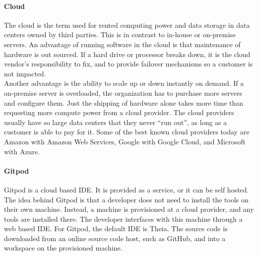 \paragraph{Cloud}
The \gls{cloud} is the term used for rented computing power and data storage in data centers owned by third parties.
This is in contrast to in-house or on-premise servers.
An advantage of running software in the \gls{cloud} is that maintenance of hardware is out sourced.
If a hard drive or processor breaks down, it is the cloud vendor's responsibility to fix, and to provide failover mechanisms so a customer is not impacted.\\

Another advantage is the ability to scale up or down instantly on demand.
If a on-premise server is overloaded, the organization has to purchase more servers and configure them.
Just the shipping of hardware alone takes more time than requesting more compute power from a \gls{cloud} provider.
The cloud providers usually have so large data centers that they never ``run out'', as long as a customer is able to pay for it.
Some of the best known cloud providers today are Amazon with Amazon Web Services, Google with Google Cloud, and Microsoft with Azure.

\paragraph{Gitpod}
Gitpod is a \gls{cloud} based \acrfull{IDE}.
It is provided as a service, or it can be self hosted.
The idea behind \gls{Gitpod} is that a developer does not need to install the tools on their own machine.
Instead, a machine is provisioned at a cloud provider, and any tools are installed there.
The developer interfaces with this machine through a web based \acrshort{IDE}.
For Gitpod, the default \acrshort{IDE} is \gls{Theia}.
The source code is downloaded from an online source code host, such as \gls{GitHub}, and into a workspace on the provisioned machine. %
